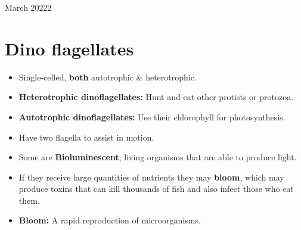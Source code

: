 \documentclass[12pt,oneside]{book} %
\begin{document}
\begin{lec}{March 20222}
  \section*{Dino flagellates}
  \begin{itemize}
    \item Single-celled, \textbf{both} autotrophic \& heterotrophic.
    \item \textbf{Heterotrophic dinoflagellates:} Hunt and eat other protists or protozoa.
    \item \textbf{Autotrophic dinoflagellates:} Use their chlorophyll for photosynthesis.
    \item Have two flagella to assist in motion.
    \item Some are \textbf{Bioluminescent}; living organisms that are able to produce light.
    \item If they receive large quantities of nutrients they may \textbf{bloom}, which may produce toxins that can kill
       thousands of fish and also infect those who eat them.
    \item \textbf{Bloom:} A rapid reproduction of microorganisms.
  \end{itemize}





  
  


  
















  





  

  
  



  


  



  

  

  





  




















	\end{lec}
\end{document}
